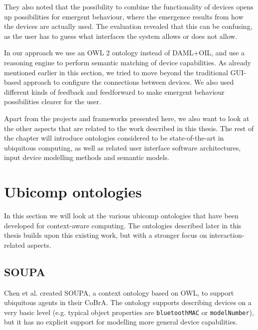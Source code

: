 They also noted that the possibility to combine the functionality of devices opens up possibilities for emergent behaviour, where the emergence results from how the devices are actually used. The evaluation revealed that this can be confusing, as the user has to guess what interfaces the system allows or does not allow.

In our approach we use an \ac{OWL} 2 ontology instead of \ac{DAML}+\-\ac{OIL}, and use a reasoning engine to perform semantic matching of device capabilities. As already mentioned earlier in this section, we tried to move beyond the traditional \ac{GUI}-based approach to configure the connections between devices. We also used different kinds of feedback and feedforward to make emergent behaviour possibilities clearer for the user.

Apart from the projects and frameworks presented here, we also want to look at the other aspects that are related to the work described in this thesis. The rest of the chapter will introduce ontologies considered to be state-of-the-art in ubiquitous computing, as well as related user interface software architectures, input device modelling methods and semantic models.

\section{Ubicomp ontologies}
\label{UbicompOntologies}
In this section we will look at the various ubicomp ontologies that have been developed for context-aware computing. The ontologies described later in this thesis builds upon this existing work, but with a stronger focus on interaction-related aspects. 
 

\subsection{SOUPA}

Chen et al. \cite{Chen2004} created \ac{SOUPA}, a context ontology based on \ac{OWL}, to support ubiquitous agents in their \ac{CoBrA}. The ontology supports describing devices on a very basic level (e.g. typical object properties are \texttt{bluetoothMAC} or \texttt{modelNumber}), but it has no explicit support for modelling more general device capabilities.

